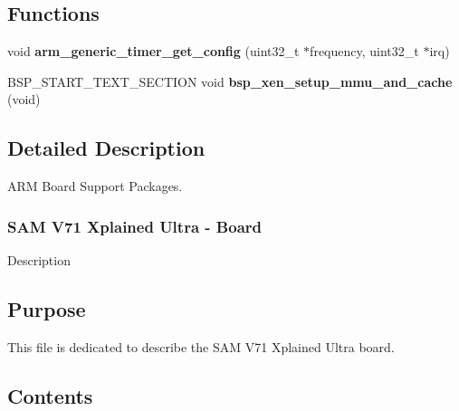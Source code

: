 \subsection*{Functions}
\begin{DoxyCompactItemize}
\item 
\mbox{\label{group__RTEMSBSPsARM_ga371b5f674b0ec4957ef0fee036cf6897}} 
void {\bfseries arm\+\_\+generic\+\_\+timer\+\_\+get\+\_\+config} (uint32\+\_\+t $\ast$frequency, uint32\+\_\+t $\ast$irq)
\item 
\mbox{\label{group__RTEMSBSPsARM_gaede42a569c9b96c34dddde0d341928ab}} 
B\+S\+P\+\_\+\+S\+T\+A\+R\+T\+\_\+\+T\+E\+X\+T\+\_\+\+S\+E\+C\+T\+I\+ON void {\bfseries bsp\+\_\+xen\+\_\+setup\+\_\+mmu\+\_\+and\+\_\+cache} (void)
\end{DoxyCompactItemize}


\subsection{Detailed Description}
A\+RM Board Support Packages. 

\hypertarget{samv7_Xplained_ultra_board_desc}{}\subsubsection{S\+A\+M V71 Xplained Ultra -\/ Board}\label{samv7_Xplained_ultra_board_desc}
Description\hypertarget{group__RTEMSBSPsARM_Purpose}{}\subsection{Purpose}\label{group__RTEMSBSPsARM_Purpose}
This file is dedicated to describe the S\+AM V71 Xplained Ultra board.\hypertarget{group__RTEMSBSPsARM_Contents}{}\subsection{Contents}\label{group__RTEMSBSPsARM_Contents}

